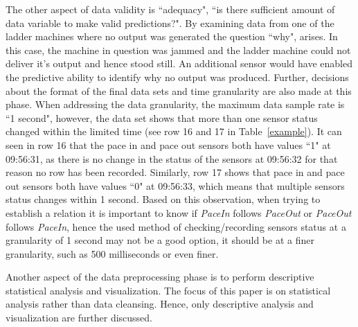 \documentclass[runningheads]{llncs}
\begin{document}
The other aspect of data validity is ``adequacy", ``is there sufficient amount of data variable to make valid predictions?". By examining data from one of the ladder machines where no output was generated the question ``why", arises. In this case, the  machine in question was jammed and the ladder machine could not deliver it’s output and hence stood still. An additional sensor would have enabled the predictive ability to identify why no output was produced. Further, decisions about the format of the final data sets and time granularity are also made at this phase. When addressing the data granularity, the maximum data sample rate is ``1 second", however, the data set shows that more than one sensor status changed within the limited time (see row 16 and 17 in Table~\ref{example}). It can seen in row 16 that the pace in and pace out sensors both have values ``1" at 09:56:31, as there is no change in the status of the sensors at 09:56:32 for that reason no row has been recorded. Similarly, row 17 shows that pace in and pace out sensors both have values ``0" at 09:56:33, which means that multiple sensors status changes within 1 second. Based on this observation, when trying to establish a relation it is important to know if \emph{PaceIn} follows \emph{PaceOut} or \emph{PaceOut} follows \emph{PaceIn}, hence the used method of checking/recording sensors status at a granularity of 1 second may not be a good option, it should be at a finer granularity, such as 500 milliseconds or even finer.

Another aspect of the data preprocessing phase is to perform descriptive statistical analysis and visualization. The focus of this paper is on statistical analysis rather than data cleansing. Hence, only descriptive analysis and visualization are further discussed.

\iffalse
\end{document}
